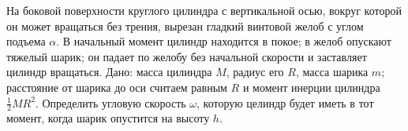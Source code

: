 На боковой поверхности круглого цилиндра с вертикальной осью,
вокруг которой он может вращаться без трения,
вырезан гладкий винтовой желоб с углом подъема $\alpha$.
В начальный момент цилиндр находится в покое; в желоб опускают тяжелый шарик;
он падает по желобу без начальной скорости и заставляет цилиндр вращаться.
Дано: масса цилиндра $M$, радиус его $R$, масса шарика $m$;
расстояние от шарика до оси считаем равным $R$ и момент инерции цилиндра
$\frac{1}{2}MR^2$.
Определить угловую скорость $\omega$, которую целиндр будет иметь в тот момент,
когда шарик опустится на высоту $h$.

